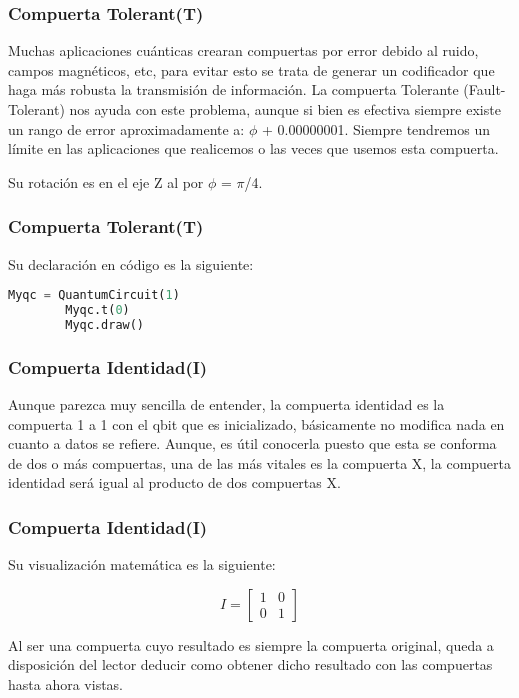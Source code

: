 \documentclass[spanish]{beamer}
\begin{document}
    \newpage\begin{frame}[fragile]
     \frametitle{Compuerta Tolerant(T)}
     Muchas aplicaciones cuánticas crearan compuertas por error debido al ruido, campos magnéticos, etc, para evitar esto se trata de generar un codificador que haga más robusta la transmisión de información. La compuerta Tolerante (Fault-Tolerant) nos ayuda con este problema, aunque si bien es efectiva siempre existe un rango de error aproximadamente a: {$\phi$} + 0.00000001. Siempre tendremos un límite en las aplicaciones que realicemos o las veces que usemos esta compuerta.
     
     Su rotación es en el eje Z al por {$\phi$} = {$\pi$}/4.
     \end{frame}  
     
    \newpage\begin{frame}[fragile]
     \frametitle{Compuerta Tolerant(T)}
     Su declaración en código es la siguiente:
     
       \begin{lstlisting}[language=Python]
        Myqc = QuantumCircuit(1)
        Myqc.t(0)
        Myqc.draw() \end{lstlisting}
    \end{frame} 
     \newpage\begin{frame}[fragile]
     \frametitle{Compuerta Identidad(I)}
    Aunque parezca muy sencilla de entender, la compuerta identidad es la compuerta 1 a 1 con el qbit que es inicializado, básicamente no modifica nada en cuanto a datos se refiere. Aunque, es útil conocerla puesto que esta se conforma de dos o más compuertas, una de las más vitales es la compuerta X, la compuerta identidad será igual al producto de dos compuertas X.
     \end{frame} 
     
     \newpage\begin{frame}[fragile]
     \frametitle{Compuerta Identidad(I)} 
    Su visualización matemática es la siguiente:
     
      \begin{equation}
        I =\begin{bmatrix}
            1 & 0\\
            0 & 1
        \end{bmatrix}
        \end{equation}
     
    Al ser una compuerta cuyo resultado es siempre la compuerta original, queda a disposición del lector deducir como obtener dicho resultado con las compuertas hasta ahora vistas.
      \end{frame} 
     
\end{document}
